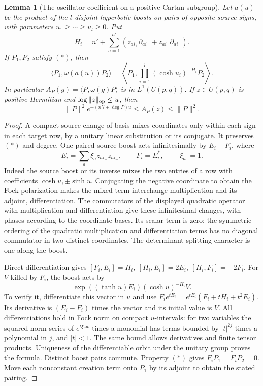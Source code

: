 \documentclass[a4paper,11pt]{article}
\newtheorem{lemma}[proposition]{Lemma}
\theoremstyle{definition}
\theoremstyle{remark}
\numberwithin{equation}{section}
\begin{document}
\begin{lemma}[The oscillator coefficient on a positive Cartan subgroup]\leavevmode
\label{lem:oscillatorcartan710}
Let \(a(u)\) be the product of the \(l\) disjoint hyperbolic
boosts on pairs of opposite source signs, with parameters
\(u_1\ge\cdots\ge u_l\ge0\). Put
\[
 H_i=n'+\sum_{a=1}^{n'}(z_{ai_+}\partial_{ai_+}
                         +z_{ai_-}\partial_{ai_-}).
\]
If \(P_1,P_2\) satisfy \((*)\), then
\[
 \langle P_1,\omega(a(u))P_2\rangle
       =\left\langle P_1,\prod_{i=1}^l
                        (\cosh u_i)^{-H_i}P_2\right\rangle .
\]
In particular \(A_P(g)=\langle P,\omega(g)P\rangle\) is in
\(L^1(U(p,q))\). If \(z\in U(p,q)\) is positive Hermitian and
\(\log\|z\|_{\rm op}\le u\), then
\[
   \|P\|^2 e^{-(n'l+\deg P)u}\le A_P(z)\le\|P\|^2 .
\]
\end{lemma}
\begin{proof}
A compact source change of basis mixes coordinates only
within each sign in each target row, by a unitary linear
substitution or its conjugate. It preserves \((*)\) and
degree. One paired source boost acts infinitesimally by
\(E_i-F_i\), where
\[
 E_i=\sum_a \xi_a z_{ai_+}z_{ai_-},\qquad F_i=E_i^*,
                           \qquad |\xi_a|=1 .
\]
Indeed the source boost or its inverse mixes the two entries
of a row with coefficients \(\cosh u,\pm\sinh u\).
Conjugating the negative coordinate to obtain the Fock
polarization makes the mixed term interchange multiplication
and its adjoint, differentiation. The commutators of the
displayed quadratic operator with multiplication and
differentiation give these infinitesimal changes, with
phases according to the coordinate bases. Its scalar term
is zero: the symmetric ordering of the quadratic
multiplication and differentiation terms has no diagonal
commutator in two distinct coordinates. The determinant
splitting character is one along the boost.

Direct differentiation gives
\([F_i,E_i]=H_i,\ [H_i,E_i]=2E_i,\ [H_i,F_i]=-2F_i\).
For \(V\) killed by \(F_i\), the boost acts by
\[
             \exp((\tanh u)E_i)(\cosh u)^{-H_i}V .
\]
To verify it, differentiate this vector in \(u\) and use
\(F_i e^{tE_i}=e^{tE_i}(F_i+tH_i+t^2E_i)\). Its derivative
is \((E_i-F_i)\) times the vector and its initial value is
\(V\). All differentiations hold in Fock norm on compact
\(u\)-intervals: for two variables the squared norm series
of \(e^{t\xi zw}\) times a monomial has terms bounded by
\(|t|^{2j}\) times a polynomial in \(j\), and \(|t|<1\).
The same bound allows derivatives and finite tensor
products. Uniqueness of the differentiable orbit under the
unitary group proves the formula. Distinct boost pairs
commute. Property \((*)\) gives \(F_iP_1=F_iP_2=0\).
Move each nonconstant creation term onto \(P_1\) by its
adjoint to obtain the stated pairing.


\end{proof}
\end{document}
